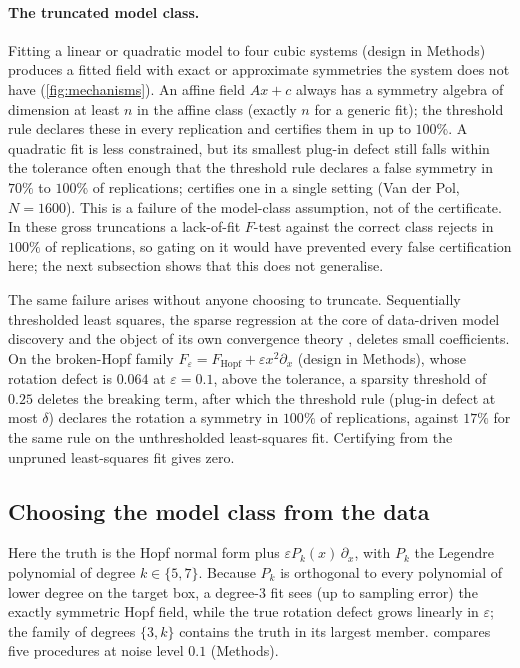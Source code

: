 \paragraph{The truncated model class.} Fitting a linear or quadratic model to
four cubic systems (design in Methods) produces a fitted field with exact or
approximate symmetries the system does not have (\cref{fig:mechanisms}). An
affine field $Ax + c$ always has a symmetry algebra of dimension at least $n$
in the affine class (exactly $n$ for a generic fit); the threshold rule
declares these in every replication and \symcert{} certifies them in up to
$100\%$. A quadratic fit is less constrained, but its smallest plug-in defect
still falls within the tolerance often enough that the threshold rule declares
a false symmetry in $70\%$ to $100\%$ of replications; \symcert{} certifies one
in a single setting (Van der Pol, $N = 1600$). This is a failure of the
model-class assumption, not of the certificate. In these gross truncations a
lack-of-fit $F$-test against the correct class rejects in $100\%$ of
replications, so gating on it would have prevented every false certification
here; the next subsection shows that this does not generalise.

The same failure arises without anyone choosing to truncate. Sequentially
thresholded least squares, the sparse regression at the core of data-driven
model discovery \citep{brunton2016discovering,kaptanoglu2022pysindy} and the
object of its own convergence theory \citep{zhang2019convergence}, deletes
small coefficients. On the broken-Hopf family $F_\varepsilon =
F_{\mathrm{Hopf}} + \varepsilon x^2\partial_x$ (design in Methods), whose
rotation defect is $0.064$ at $\varepsilon = 0.1$, above the tolerance, a
sparsity threshold of $0.25$ deletes the breaking term, after which the
threshold rule (plug-in defect at most $\delta$) declares the rotation a
symmetry in $100\%$ of replications, against $17\%$ for the same rule on the
unthresholded least-squares fit. Certifying from the unpruned least-squares fit
gives zero.

\subsection{Choosing the model class from the data}
\label{sec:selection}

Here the truth is the Hopf normal form plus $\varepsilon P_k(x)\,\partial_x$,
with $P_k$ the Legendre polynomial of degree $k \in \{5,7\}$. Because $P_k$ is
orthogonal to every polynomial of lower degree on the target box, a degree-$3$
fit sees (up to sampling error) the exactly symmetric Hopf field, while the
true rotation defect grows linearly in $\varepsilon$; the family of degrees
$\{3, k\}$ contains the truth in its largest member. 
compares five procedures at noise level $0.1$ (Methods).


